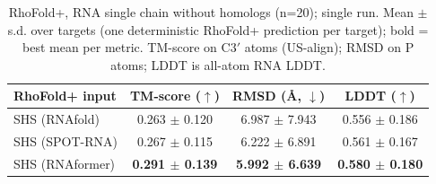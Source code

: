 \begin{table}[htbp]
\centering
\caption{RhoFold+, RNA single chain without homologs (n=20); single run. Mean $\pm$ s.d. over targets (one deterministic RhoFold+ prediction per target); bold = best mean per metric. TM-score on C3$'$ atoms (US-align); RMSD on P atoms; LDDT is all-atom RNA LDDT.}
\label{tab:rf_rna_single_chain_without_homologs}
\begin{tabular}{lccc}
\toprule
RhoFold+ input & TM-score ($\uparrow$) & RMSD (\AA, $\downarrow$) & LDDT ($\uparrow$) \\
\midrule
SHS (RNAfold) & 0.263 $\pm$ 0.120 & 6.987 $\pm$ 7.943 & 0.556 $\pm$ 0.186 \\
SHS (SPOT-RNA) & 0.267 $\pm$ 0.115 & 6.222 $\pm$ 6.891 & 0.561 $\pm$ 0.167 \\
SHS (RNAformer) & \textbf{0.291 $\pm$ 0.139} & \textbf{5.992 $\pm$ 6.639} & \textbf{0.580 $\pm$ 0.180} \\
\bottomrule
\end{tabular}
\end{table}
